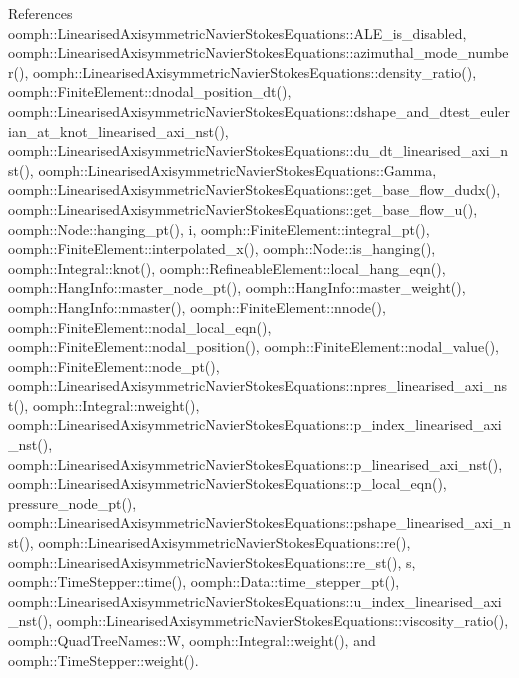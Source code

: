 References oomph\+::\+Linearised\+Axisymmetric\+Navier\+Stokes\+Equations\+::\+A\+L\+E\+\_\+is\+\_\+disabled, oomph\+::\+Linearised\+Axisymmetric\+Navier\+Stokes\+Equations\+::azimuthal\+\_\+mode\+\_\+number(), oomph\+::\+Linearised\+Axisymmetric\+Navier\+Stokes\+Equations\+::density\+\_\+ratio(), oomph\+::\+Finite\+Element\+::dnodal\+\_\+position\+\_\+dt(), oomph\+::\+Linearised\+Axisymmetric\+Navier\+Stokes\+Equations\+::dshape\+\_\+and\+\_\+dtest\+\_\+eulerian\+\_\+at\+\_\+knot\+\_\+linearised\+\_\+axi\+\_\+nst(), oomph\+::\+Linearised\+Axisymmetric\+Navier\+Stokes\+Equations\+::du\+\_\+dt\+\_\+linearised\+\_\+axi\+\_\+nst(), oomph\+::\+Linearised\+Axisymmetric\+Navier\+Stokes\+Equations\+::\+Gamma, oomph\+::\+Linearised\+Axisymmetric\+Navier\+Stokes\+Equations\+::get\+\_\+base\+\_\+flow\+\_\+dudx(), oomph\+::\+Linearised\+Axisymmetric\+Navier\+Stokes\+Equations\+::get\+\_\+base\+\_\+flow\+\_\+u(), oomph\+::\+Node\+::hanging\+\_\+pt(), i, oomph\+::\+Finite\+Element\+::integral\+\_\+pt(), oomph\+::\+Finite\+Element\+::interpolated\+\_\+x(), oomph\+::\+Node\+::is\+\_\+hanging(), oomph\+::\+Integral\+::knot(), oomph\+::\+Refineable\+Element\+::local\+\_\+hang\+\_\+eqn(), oomph\+::\+Hang\+Info\+::master\+\_\+node\+\_\+pt(), oomph\+::\+Hang\+Info\+::master\+\_\+weight(), oomph\+::\+Hang\+Info\+::nmaster(), oomph\+::\+Finite\+Element\+::nnode(), oomph\+::\+Finite\+Element\+::nodal\+\_\+local\+\_\+eqn(), oomph\+::\+Finite\+Element\+::nodal\+\_\+position(), oomph\+::\+Finite\+Element\+::nodal\+\_\+value(), oomph\+::\+Finite\+Element\+::node\+\_\+pt(), oomph\+::\+Linearised\+Axisymmetric\+Navier\+Stokes\+Equations\+::npres\+\_\+linearised\+\_\+axi\+\_\+nst(), oomph\+::\+Integral\+::nweight(), oomph\+::\+Linearised\+Axisymmetric\+Navier\+Stokes\+Equations\+::p\+\_\+index\+\_\+linearised\+\_\+axi\+\_\+nst(), oomph\+::\+Linearised\+Axisymmetric\+Navier\+Stokes\+Equations\+::p\+\_\+linearised\+\_\+axi\+\_\+nst(), oomph\+::\+Linearised\+Axisymmetric\+Navier\+Stokes\+Equations\+::p\+\_\+local\+\_\+eqn(), pressure\+\_\+node\+\_\+pt(), oomph\+::\+Linearised\+Axisymmetric\+Navier\+Stokes\+Equations\+::pshape\+\_\+linearised\+\_\+axi\+\_\+nst(), oomph\+::\+Linearised\+Axisymmetric\+Navier\+Stokes\+Equations\+::re(), oomph\+::\+Linearised\+Axisymmetric\+Navier\+Stokes\+Equations\+::re\+\_\+st(), s, oomph\+::\+Time\+Stepper\+::time(), oomph\+::\+Data\+::time\+\_\+stepper\+\_\+pt(), oomph\+::\+Linearised\+Axisymmetric\+Navier\+Stokes\+Equations\+::u\+\_\+index\+\_\+linearised\+\_\+axi\+\_\+nst(), oomph\+::\+Linearised\+Axisymmetric\+Navier\+Stokes\+Equations\+::viscosity\+\_\+ratio(), oomph\+::\+Quad\+Tree\+Names\+::W, oomph\+::\+Integral\+::weight(), and oomph\+::\+Time\+Stepper\+::weight().



